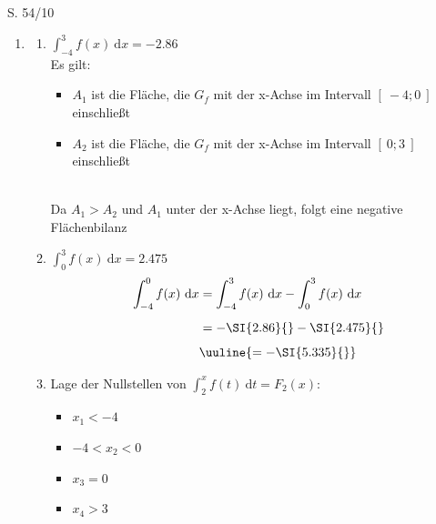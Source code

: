 \begin{Exercise}{S. 54/10}{}
\begin{enumerate}[leftmargin=*]
    \item [10.] {
        \begin{enumerate}[label=\alph*),leftmargin=*]
            \item [a)] {
                $\displaystyle \int_{-4}^{3} f(x) \ \mathrm{d}x = -\SI{2.86}{}$\\[2.0ex]
                Es gilt: \quad \begin{minipage}[t]{0.85\linewidth}
                    \begin{itemize}[leftmargin=*]
                        \item $A_{1}$ ist die Fläche, die $G_{f}$ mit der x-Achse im Intervall $\left[ \ -4; 0 \ \right]$ einschließt
                        \item $A_{2}$ ist die Fläche, die $G_{f}$ mit der x-Achse im Intervall $\left[ \ 0; 3 \ \right]$ einschließt
                    \end{itemize}
                \end{minipage}\\[2.0ex]
                Da $A_{1} > A_{2}$ und $A_{1}$ unter der x-Achse liegt, folgt eine negative Flächenbilanz\\
                }
            \item [b)] {
                $\displaystyle \int_{0}^{3} f(x) \ \mathrm{d}x = \SI{2.475}{}$\\
                \begin{align*}
                    \int_{-4}^{0} f(x) \ \mathrm{d}x &= \int_{-4}^{3} f(x) \ \mathrm{d}x - \int_{0}^{3} f(x) \ \mathrm{d}x \\[1.0ex]
                    &= -\SI{2.86}{} - \SI{2.475}{} \\[1.0ex]
                    &\uuline{= -\SI{5.335}{}}
                \end{align*}
                }
            \item [c)] {
                Lage der Nullstellen von $\displaystyle \int_{2}^{x} f(t) \ \mathrm{d}t = F_{2}(x)$:
                \begin{itemize}
                    \item $x_{1} < -4$
                    \item $-4 < x_{2} < 0$
                    \item $x_{3} = 0$
                    \item $x_{4} > 3$

\end{itemize}}
\end{enumerate}}
\end{enumerate}
\end{Exercise}
